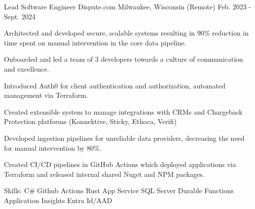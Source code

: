 

\begin{cventries}

  \cventry
    {Lead Software Engineer} %
    {Dispute.com} %
    {Milwaukee, Wisconsin (Remote)} %
    {Feb. 2023 - Sept. 2024} %
    {
      \begin{cvitems} %
        \item {Architected and developed secure, scalable systems resulting in 90\% reduction in time spent on 
                manual intervention in the core data pipeline.}
        \item {Onboarded and led a team of 3 developers towards a culture of communication and excellence.}
        \item {Introduced Auth0 for client authentication and authorization, automated management via Terraform.}
        \item {Created extensible system to manage integrations with CRMs and Chargeback Protection platforms (Konnektive, Sticky, Ethoca, Verifi)}
        \item {Developed ingestion pipelines for unreliable data providers, decreasing the need for manual intervention by 80\%.}
        \item {Created CI/CD pipelines in GitHub Actions which deployed applications via Terraform and released internal shared Nuget and NPM packages.}
        \item {Skills: C\# \textbullet{} Github Actions \textbullet{} Rust \textbullet{} App Service \textbullet{} SQL Server \textbullet{} Durable Functions \textbullet{} Application Insights \textbullet{} Entra Id/AAD}
      \end{cvitems}
    }


\end{cventries}
